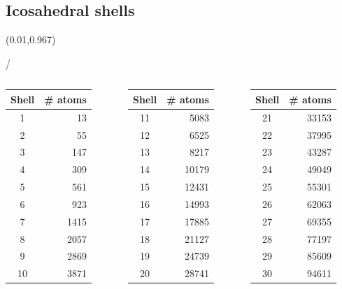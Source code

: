 \documentclass{beamer}
\makeatletter
\newcommand{\framenumber}{
\begin{textblock}{0}(0.01,0.967)
\begin{scriptsize}
{\color{gray}\insertframenumber/\inserttotalframenumber}
\end{scriptsize}
\end{textblock}
}
\makeatother
\begin{document}
\subsection{Icosahedral shells}
\begin{frame}{}\framenumber
\begin{columns}[t]

\begin{tabular}{c|r}
Shell & \# atoms \\ \hline \hline
 1 &    13 \\
 2 &    55 \\
 3 &   147 \\
 4 &   309 \\
 5 &   561 \\
 6 &   923 \\
 7 &  1415 \\
 8 &  2057 \\
 9 &  2869 \\
10 &  3871 \\
\end{tabular}

\begin{tabular}{c|r}
Shell & \# atoms \\ \hline \hline
11 &  5083 \\
12 &  6525 \\
13 &  8217 \\
14 & 10179 \\
15 & 12431 \\
16 & 14993 \\
17 & 17885 \\
18 & 21127 \\
19 & 24739 \\
20 & 28741 \\
\end{tabular}

\begin{tabular}{c|r}
Shell & \# atoms \\ \hline \hline
21 & 33153 \\
22 & 37995 \\
23 & 43287 \\
24 & 49049 \\
25 & 55301 \\
26 & 62063 \\
27 & 69355 \\
28 & 77197 \\
29 & 85609 \\
30 & 94611 \\
\end{tabular}

\end{columns}

\end{frame}
\end{document}
